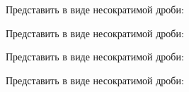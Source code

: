 \begin{enumcols}[label=\textbf{\arabic*.}]
	\item {}
	\item Представить в виде несократимой дроби:
	\begin{enumcols}[itemcolumns=3]
		\item {}
		\item {}
		\item {}
		\item {}
		\item {}
		\item {}
	\end{enumcols}
	\item Представить в виде несократимой дроби:
	\begin{enumcols}[itemcolumns=3]
		\item {}
		\item {}
		\item {}
		\item {}
		\item {}
	\end{enumcols}
	\item Представить в виде несократимой дроби:
	\begin{enumcols}[itemcolumns=3]
		\item {}
		\item {}
		\item {}
		\item {}
		\item {}
	\end{enumcols}
	\item Представить в виде несократимой дроби:
	\begin{enumcols}[itemcolumns=2]
		\item {}
		\item {}
		\item {}
		\item {}
		\item {}
	\end{enumcols}
	\item {}
	\item {}
\end{enumcols}